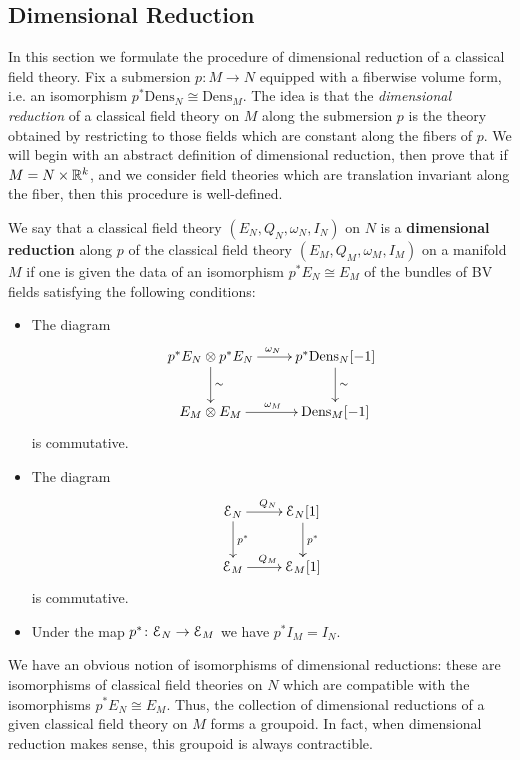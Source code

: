 \documentclass[10pt, oneside]{article}
\newcommand{\Dens}{\mathrm{Dens}}
\begin{document}

\subsection{Dimensional Reduction} \label{dim_red_section}

In this section we formulate the procedure of dimensional reduction of a classical field theory. Fix a submersion $p\colon M\rightarrow N$ equipped with a fiberwise volume form, i.e. an isomorphism $p^*\Dens_N\cong \Dens_M$.  The idea is that the \emph{dimensional reduction} of a classical field theory on $M$ along the submersion $p$ is the theory obtained by restricting to those fields which are constant along the fibers of $p$.  We will begin with an abstract definition of dimensional reduction, then prove that if $M = N \times \mathbb R^k$, and we consider field theories which are translation invariant along the fiber, then this procedure is well-defined.

\begin{definition}
We say that a classical field theory $(E_N, Q_N, \omega_N, I_N)$ on $N$ is a {\bf dimensional reduction} along $p$ of the classical field theory $(E_M, Q_M, \omega_M, I_M)$ on a manifold $M$ if one is given the data of an isomorphism $p^* E_N\cong E_M$ of the bundles of BV fields satisfying the following conditions:
\begin{itemize}
\item The diagram
\[
\xymatrix{
p^* E_N\otimes p^* E_N \ar^{\omega_N}[r] \ar^{\sim}[d] & p^*\Dens_N[-1] \ar^{\sim}[d] \\
E_M\otimes E_M \ar^{\omega_M}[r] & \Dens_M[-1]
}
\]
is commutative.

\item The diagram
\[
\xymatrix{
\cE_N \ar^{Q_N}[r] \ar^{p^*}[d] & \cE_N[1] \ar^{p^*}[d] \\
\cE_M \ar^{Q_M}[r] & \cE_M[1]
}
\]
is commutative.

\item Under the map $p^*\colon \mathcal E_N\rightarrow \mathcal E_M$ we have $p^* I_M = I_N$.
\end{itemize}
\end{definition}

We have an obvious notion of isomorphisms of dimensional reductions: these are isomorphisms of classical field theories on $N$ which are compatible with the isomorphisms $p^* E_N\cong E_M$. Thus, the collection of dimensional reductions of a given classical field theory on $M$ forms a groupoid.  In fact, when dimensional reduction makes sense, this groupoid is always contractible.
\end{document}
